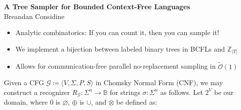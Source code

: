\documentclass[portrait,a0b,final,a4resizeable]{a0poster}
\def\jointspacing{\vspace{0.3in}}
\begin{document}
  \begin{poster}
    \begin{center}
      \begin{pcolumn}{1.03}
        \begin{minipage}[c][9cm][c]{0.85\textwidth}
          \begin{center}
          {\veryHuge \textbf{A Tree Sampler for Bounded Context-Free Languages}}\\[10mm]
          {\huge Breandan Considine}
          \end{center}
        \end{minipage}
      \end{pcolumn}
    \end{center}

    \vspace*{-0.5cm}

    \large



    \Large

    \begin{multicols}{2}



      \vspace*{-1cm}
      \null\hspace*{3cm}\begin{minipage}[c]{0.85\columnwidth}
      \begin{itemize}
        \item Analytic combinatorics: If you can count it, then you can sample it!
        \item We implement a bijection between labeled binary trees in BCFLs and $\mathbb{Z}_{|T|}$
        \item Allows for communication-free parallel no-replacement sampling in $\widetilde{\mathcal{O}}(1)$
      \end{itemize}
      \end{minipage}

      \jointspacing

      \null\hspace*{3cm}\begin{minipage}[c]{0.85\columnwidth}
          Given a CFG $\mathcal{G} \coloneqq \langle V, \Sigma, P, S\rangle$ in Chomsky Normal Form (CNF), we may construct a recognizer $R_\mathcal{G}: \Sigma^n \rightarrow \mathbb{B}$ for strings $\sigma: \Sigma^n$ as follows. Let $2^V$ be our domain, where $0$ is $\varnothing$, $\oplus$ is $\cup$, and $\otimes$ be defined as:\vspace{0.5cm}
      \end{minipage}


\end{multicols}
\end{poster}
\end{document}
